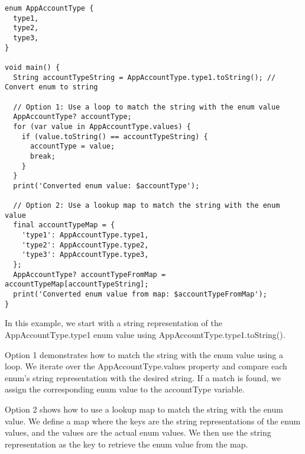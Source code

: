 \begin{lstlisting}
enum AppAccountType {
  type1,
  type2,
  type3,
}

void main() {
  String accountTypeString = AppAccountType.type1.toString(); // Convert enum to string

  // Option 1: Use a loop to match the string with the enum value
  AppAccountType? accountType;
  for (var value in AppAccountType.values) {
    if (value.toString() == accountTypeString) {
      accountType = value;
      break;
    }
  }
  print('Converted enum value: $accountType');

  // Option 2: Use a lookup map to match the string with the enum value
  final accountTypeMap = {
    'type1': AppAccountType.type1,
    'type2': AppAccountType.type2,
    'type3': AppAccountType.type3,
  };
  AppAccountType? accountTypeFromMap = accountTypeMap[accountTypeString];
  print('Converted enum value from map: $accountTypeFromMap');
}
\end{lstlisting}

In this example, we start with a string representation of the AppAccountType.type1 enum value using 
AppAccountType.type1.toString().

Option 1 demonstrates how to match the string with the enum value using a loop. We iterate over the 
AppAccountType.values property and compare each enum's string representation with the desired string. 
If a match is found, we assign the corresponding enum value to the accountType variable.

Option 2 shows how to use a lookup map to match the string with the enum value. We define a map where the keys 
are the string representations of the enum values, and the values are the actual enum values. We then use the 
string representation as the key to retrieve the enum value from the map.


